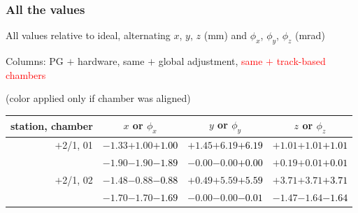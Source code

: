 \documentclass[compress]{beamer}
\begin{document}
\begin{frame}
\frametitle{All the values}
\tiny

All values relative to ideal, alternating $x$, $y$, $z$ (mm) and $\phi_x$, $\phi_y$, $\phi_z$ (mrad)

Columns: PG $+$ hardware, same $+$ global adjustment, \textcolor{red}{same $+$ track-based chambers}

\hfill (color applied only if chamber was aligned)

\vfill
\renewcommand{\arraystretch}{1.1}
\begin{tabular}{r | c | c | c}
station, chamber & $x$ or $\phi_x$ & $y$ or $\phi_y$ & $z$ or $\phi_z$ \\\hline
$+$2/1, 01 & $-1.33$\hspace{0.1 cm}$+1.00$\hspace{0.1 cm}\textcolor{black}{$+1.00$} & $+1.45$\hspace{0.1 cm}$+6.19$\hspace{0.1 cm}\textcolor{black}{$+6.19$} & $+1.01$\hspace{0.1 cm}$+1.01$\hspace{0.1 cm}\textcolor{black}{$+1.01$} \\
           & $-1.90$\hspace{0.1 cm}$-1.90$\hspace{0.1 cm}\textcolor{black}{$-1.89$} & $-0.00$\hspace{0.1 cm}$-0.00$\hspace{0.1 cm}\textcolor{black}{$+0.00$} & $+0.19$\hspace{0.1 cm}$+0.01$\hspace{0.1 cm}\textcolor{black}{$+0.01$} \\
$+$2/1, 02 & $-1.48$\hspace{0.1 cm}$-0.88$\hspace{0.1 cm}\textcolor{black}{$-0.88$} & $+0.49$\hspace{0.1 cm}$+5.59$\hspace{0.1 cm}\textcolor{black}{$+5.59$} & $+3.71$\hspace{0.1 cm}$+3.71$\hspace{0.1 cm}\textcolor{black}{$+3.71$} \\
           & $-1.70$\hspace{0.1 cm}$-1.70$\hspace{0.1 cm}\textcolor{black}{$-1.69$} & $-0.00$\hspace{0.1 cm}$-0.00$\hspace{0.1 cm}\textcolor{black}{$-0.01$} & $-1.47$\hspace{0.1 cm}$-1.64$\hspace{0.1 cm}\textcolor{black}{$-1.64$} \\

\end{tabular}
\end{frame}
\end{document}

